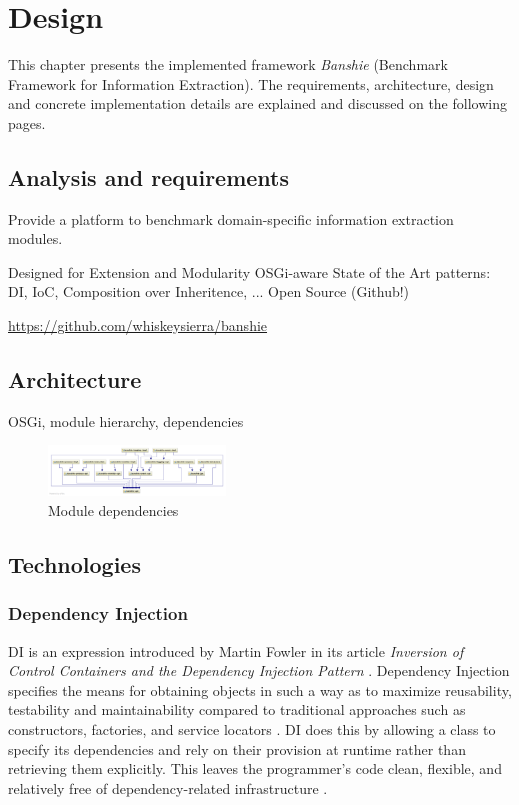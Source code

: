 \section{Design}
\label{sec:design}

This chapter presents the implemented framework \textit{Banshie} (Benchmark Framework for Information Extraction). The requirements, architecture, design and concrete implementation details are explained and discussed on the following pages.

\subsection{Analysis and requirements}
Provide a platform to benchmark domain-specific information extraction modules.

Designed for Extension and Modularity
OSGi-aware
State of the Art patterns: DI, IoC, Composition over Inheritence, ...
Open Source (Github!)

\url{https://github.com/whiskeysierra/banshie}

\subsection{Architecture}
OSGi, module hierarchy, dependencies

\newpage
\begin{figure}[H]
\centering
\includegraphics[angle=90, width=0.42\textwidth]{module-dependencies.png}
\caption{Module dependencies}
\label{fig:module-dependencies}
\end{figure}

\newpage
\subsection{Technologies}

\subsubsection{Dependency Injection}
\gls{DI} is an expression introduced by Martin Fowler in its article \textit{Inversion of Control Containers and the Dependency Injection Pattern} \cite{Fowler:2004}. Dependency Injection specifies the means for obtaining objects in such a way as to maximize reusability, testability and maintainability compared to traditional approaches such as constructors, factories, and service locators \cite{JSR330}. \gls{DI} does this by allowing a class to specify its dependencies and rely on their provision at runtime rather than retrieving them explicitly. This leaves the programmer's code clean, flexible, and relatively free of dependency-related infrastructure \cite{JSR330}.

